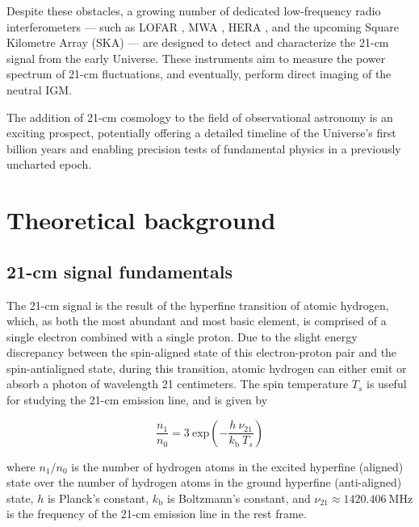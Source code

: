 \documentclass[floats,floatfix,showpacs,amssymb,prd,superscriptaddress,nofootinbib]{revtex4-2} %
\begin{document}
Despite these obstacles, a growing number of dedicated low-frequency radio interferometers — such as LOFAR \citep{van_Haarlem_2013}, MWA \citep{Beardsley_2019}, HERA \citep{DeBoer_2017}, and the upcoming Square Kilometre Array (SKA) \cite{Dewdney_2009} — are designed to detect and characterize the 21-cm signal from the early Universe. These instruments aim to measure the power spectrum of 21-cm fluctuations, and eventually, perform direct imaging of the neutral IGM.

The addition of 21-cm cosmology to the field of observational astronomy is an exciting prospect, potentially offering a detailed timeline of the Universe's first billion years and enabling precision tests of fundamental physics in a previously uncharted epoch.

\newpage
\section{Theoretical background}
\subsection{21-cm signal fundamentals}
The 21-cm signal is the result of the hyperfine transition of atomic hydrogen, which, as both the most abundant and most basic element, is comprised of a single electron combined with a single proton. Due to the slight energy discrepancy between the spin-aligned state of this electron-proton pair and the spin-antialigned state, during this transition, atomic hydrogen can either emit or absorb a photon of wavelength 21 centimeters. The spin temperature $T_s$ is useful for studying the 21-cm emission line, and is given by \citep{Purcell_Field_1956, Scott_Rees_1990}

\begin{equation}
    \frac{n_1}{n_0} = 3 ~ \text{exp} \left( -\frac{h ~ \nu_{21}}{k_\text{b} ~ T_s} \right)
\end{equation}

\noindent where $n_1/n_0$ is the number of hydrogen atoms in the excited hyperfine (aligned) state over the number of hydrogen atoms in the ground hyperfine (anti-aligned) state, $h$ is Planck's constant, $k_\text{b}$ is Boltzmann's constant, and $\nu_{21} \approx 1420.406 ~\text{MHz}$ is the frequency of the 21-cm emission line in the rest frame. 
\end{document}
